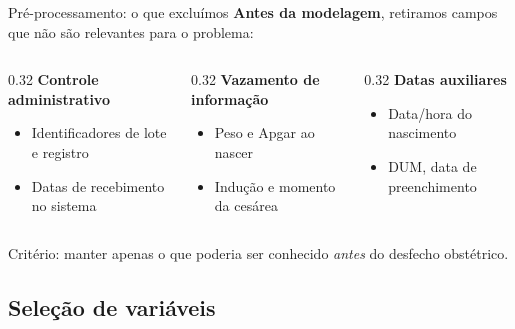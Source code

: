 \documentclass[aspectratio=169,xcolor=table]{beamer}
\begin{document}
\begin{frame}{Pré-processamento: o que excluímos}
    \textbf{Antes da modelagem}, retiramos campos que não são relevantes para o problema:

    \vspace{0.4em}
    \begin{columns}[T]
        \begin{column}{0.32\textwidth}
            \textbf{Controle administrativo}
            \begin{itemize}
                \item Identificadores de lote e registro
                \item Datas de recebimento no sistema
            \end{itemize}
        \end{column}
        \begin{column}{0.32\textwidth}
            \textbf{Vazamento de informação}
            \begin{itemize}
                \item Peso e Apgar ao nascer
                \item Indução e momento da cesárea
            \end{itemize}
        \end{column}
        \begin{column}{0.32\textwidth}
            \textbf{Datas auxiliares}
            \begin{itemize}
                \item Data/hora do nascimento
                \item DUM, data de preenchimento
            \end{itemize}
        \end{column}
    \end{columns}

    \vspace{0.6em}
    {\small Critério: manter apenas o que poderia ser conhecido \emph{antes} do desfecho obstétrico.}
\end{frame}

\subsection{Seleção de variáveis}
\end{document}
